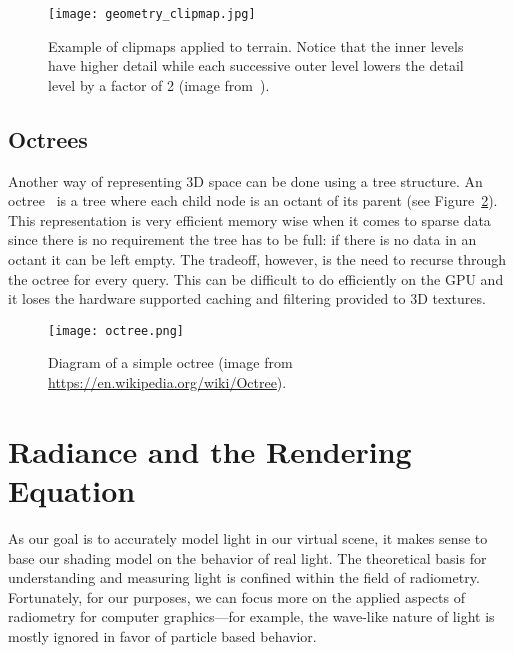 
\begin{figure}[h]
\centering
\texttt{[image: geometry\_clipmap.jpg]}
\caption{Example of clipmaps applied to terrain. Notice that the inner levels have higher detail while each successive outer level lowers the detail level by a factor of 2 (image from~\cite{Losasso:2004:GCT:1015706.1015799}).}
\label{fig:geometryclipmaps}
\end{figure}

\subsection{Octrees}
Another way of representing 3D space can be done using a tree structure. An octree~\cite{MEAGHER1982129} is a tree where each child node is an octant of its parent (see Figure~\ref{fig:octree}). This representation is very efficient memory wise when it comes to sparse data since there is no requirement the tree has to be full: if there is no data in an octant it can be left empty. The tradeoff, however, is the need to recurse through the octree for every query. This can be difficult to do efficiently on the GPU and it loses the hardware supported caching and filtering provided to 3D textures.

\begin{figure}[h]
\centering
\texttt{[image: octree.png]}
\caption{Diagram of a simple octree (image from \url{https://en.wikipedia.org/wiki/Octree}).}
\label{fig:octree}
\end{figure}

\section{Radiance and the Rendering Equation}
As our goal is to accurately model light in our virtual scene, it makes sense to base our shading model on the behavior of real light. The theoretical basis for understanding and measuring light is confined within the field of radiometry. Fortunately, for our purposes, we can focus more on the applied aspects of radiometry for computer graphics---for example, the wave-like nature of light is mostly ignored in favor of particle based behavior.

